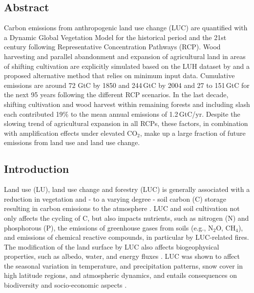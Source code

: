 \subsection*{Abstract}
{\sf Carbon emissions from anthropogenic land use change (LUC) are quantified with a Dynamic Global Vegetation Model for the historical period and the 21st century following Representative Concentration Pathways (RCP). Wood harvesting and parallel abandonment and expansion of agricultural land in areas of shifting cultivation are explicitly simulated based on the LUH dataset by \citet{hurtt06gcb} and a proposed alternative method that relies on minimum input data. Cumulative emissions are around 72 GtC by 1850 and 244\,GtC by 2004 and 27 to 151\,GtC for the next 95 years following the different RCP scenarios. In the last decade, shifting cultivation and wood harvest within remaining forests and including slash each contributed 19\% to the mean annual emissions of 1.2\,GtC/yr. Despite the slowing trend of agricultural expansion in all RCPs, these factors, in combination with amplification effects under elevated CO$_2$, make up a large fraction of future emissions from land use and land use change.}

\subsection*{Introduction}

Land use (LU), land use change and forestry (LUC) is generally associated with a reduction in vegetation \citep{baccini12, harris12} and - to a varying degree - soil carbon (C) storage \citep{guo02} resulting in carbon emissions to the atmosphere \citep{watson00,mcguire2001gbc,houghton12bg}. LUC and soil cultivation not only affects the cycling of C, but also impacts nutrients, such as nitrogen (N) and phosphorous (P), the emissions of greenhouse gases from soils (e.g., N$_2$O, CH$_4$), and emissions of chemical reactive compounds, in particular by LUC-related fires. The modification of the land surface by LUC also affects biogeophysical properties, such as albedo, water, and energy fluxes \citep{bala07pnas,feddema05,claussen2001grl}. LUC was shown to affect the seasonal variation in temperature, and precipitation patterns, snow cover in high latitude regions, and atmospheric dynamics, and entails consequences on biodiversity and socio-economic aspects \citep{unep2002, iucn2000}.

